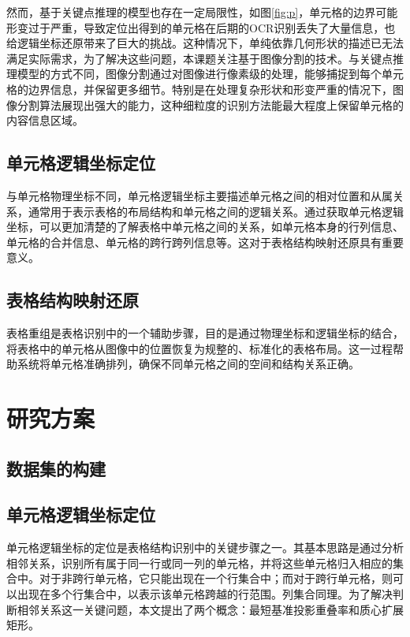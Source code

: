 \documentclass[UTF8,12pt, AutoFakeBold,fontset = founder]{ctexart}
\begin{document}
然而，基于关键点推理的模型也存在一定局限性，如图\ref{fig:p}，单元格的边界可能形变过于严重，导致定位出得到的单元格在后期的OCR识别丢失了大量信息，也给逻辑坐标还原带来了巨大的挑战。这种情况下，单纯依靠几何形状的描述已无法满足实际需求，为了解决这些问题，本课题关注基于图像分割的技术。与关键点推理模型的方式不同，图像分割通过对图像进行像素级的处理，能够捕捉到每个单元格的边界信息，并保留更多细节。特别是在处理复杂形状和形变严重的情况下，图像分割算法展现出强大的能力，这种细粒度的识别方法能最大程度上保留单元格的内容信息区域。

\subsection{单元格逻辑坐标定位}

与单元格物理坐标不同，单元格逻辑坐标主要描述单元格之间的相对位置和从属关系，通常用于表示表格的布局结构和单元格之间的逻辑关系。通过获取单元格逻辑坐标，可以更加清楚的了解表格中单元格之间的关系，如单元格本身的行列信息、单元格的合并信息、单元格的跨行跨列信息等。这对于表格结构映射还原具有重要意义。

\subsection{表格结构映射还原}

表格重组是表格识别中的一个辅助步骤，目的是通过物理坐标和逻辑坐标的结合，将表格中的单元格从图像中的位置恢复为规整的、标准化的表格布局。这一过程帮助系统将单元格准确排列，确保不同单元格之间的空间和结构关系正确。

\section{研究方案}
\subsection{数据集的构建}
\subsection{单元格逻辑坐标定位}

单元格逻辑坐标的定位是表格结构识别中的关键步骤之一。其基本思路是通过分析相邻关系，识别所有属于同一行或同一列的单元格，并将这些单元格归入相应的集合中。对于非跨行单元格，它只能出现在一个行集合中；而对于跨行单元格，则可以出现在多个行集合中，以表示该单元格跨越的行范围。列集合同理。为了解决判断相邻关系这一关键问题，本文提出了两个概念：最短基准投影重叠率和质心扩展矩形。
\end{document}
